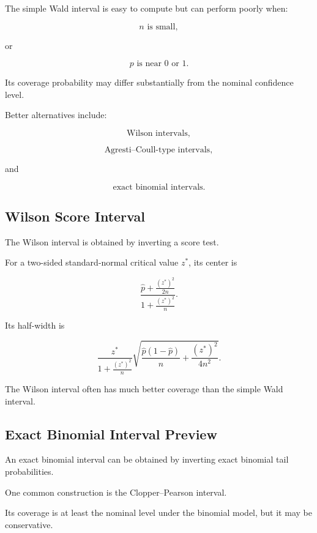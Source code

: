 The simple Wald interval is easy to compute but can perform poorly when:

\[
\boxed{
n
\text{ is small},
}
\]

or

\[
\boxed{
p
\text{ is near }0\text{ or }1.
}
\]

Its coverage probability may differ substantially from the nominal
confidence level.

Better alternatives include:

\[
\boxed{
\text{Wilson intervals},
}
\]

\[
\boxed{
\text{Agresti--Coull-type intervals},
}
\]

and

\[
\boxed{
\text{exact binomial intervals}.
}
\]

\subsection{Wilson Score Interval}
\label{subsec:wilson-score-interval}

The Wilson interval is obtained by inverting a score test.

For a two-sided standard-normal critical value \(z^*\), its center is

\[
\boxed{
\frac{
\widehat{p}
+
\frac{(z^*)^2}{2n}
}{
1+\frac{(z^*)^2}{n}
}.
}
\]

Its half-width is

\[
\boxed{
\frac{
z^*
}{
1+\frac{(z^*)^2}{n}
}
\sqrt{
\frac{
\widehat{p}(1-\widehat{p})
}{n}
+
\frac{
(z^*)^2
}{
4n^2
}
}.
}
\]

The Wilson interval often has much better coverage than the simple Wald
interval.

\subsection{Exact Binomial Interval Preview}
\label{subsec:exact-binomial-ci-preview}

An exact binomial interval can be obtained by inverting exact binomial
tail probabilities.

One common construction is the Clopper--Pearson interval.

Its coverage is at least the nominal level under the binomial model, but
it may be conservative.


